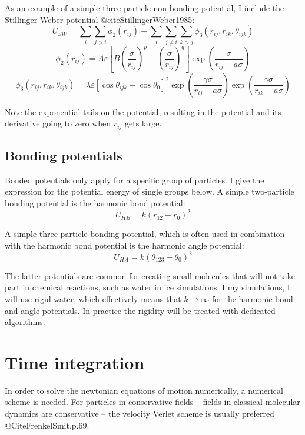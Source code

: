 As an example of a simple three-particle non-bonding potential, I include the Stillinger-Weber potential @citeStillingerWeber1985:
\begin{equation}
	U_{SW} = \sum_i \sum_{j>i} \phi_2(r_{ij}) + \sum_i \sum_{j\neq i} \sum_{k>j} \phi_3(r_{ij}, r_{ik}, \theta_{ijk})
\end{equation}
\begin{equation}
	\phi_2(r_{ij}) = A\varepsilon\left[ B \left( \frac{\sigma}{r_{ij}}\right)^p-\left(\frac{\sigma}{r_{ij}}\right)^q\right]\exp\left(\frac{\sigma}{r_{ij}-a\sigma}\right)
\end{equation}
\begin{equation}
	\phi_3(r_{ij}, r_{ik}, \theta_{ijk}) = \lambda\varepsilon\left[ \cos{\theta_{ijk}} - \cos{\theta_0}\right]^2 \exp\left( \frac{\gamma\sigma}{r_{ij}-a\sigma}\right) \exp\left(\frac{\gamma \sigma}{r_{ik}-a\sigma} \right)
\end{equation}

Note the exponential tails on the potential, resulting in the potential and its derivative going to zero when $r_{ij}$ gets large.

\subsection{Bonding potentials}
Bonded potentials only apply for a specific group of particles. I give the expression for the potential energy of single groups below.
A simple two-particle bonding potential is the harmonic bond potential:
\begin{equation}
	U_{HB} = k(r_{12} - r_0)^2
\end{equation}

A simple three-particle bonding potential, which is often used in combination with the harmonic bond potential is the harmonic angle potential:
\begin{equation}
	U_{HA} = k(\theta_{123} - \theta_0)^2
\end{equation}

The latter potentials are common for creating small molecules that will not take part in chemical reactions, such as water in ice simulations. I my simulations, I will use rigid water, which effectively means that $k\to\infty$ for the harmonic bond and angle potentials. In practice the rigidity will be treated with dedicated algorithms.

\section{Time integration}
In order to solve the newtonian equations of motion numerically, a numerical scheme is needed. For particles in conservative fields -- fields in classical molecular dynamics are conservative -- the velocity Verlet scheme is usually preferred @CiteFrenkelSmit.p.69. 

